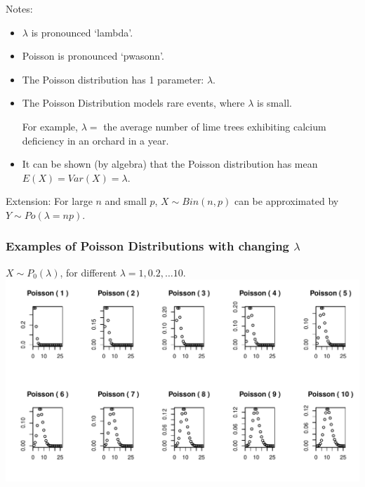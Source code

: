 \documentclass[t,xcolor=pdftex,dvipsnames,table]{beamer}\usepackage[]{graphicx}\usepackage[]{color}
\makeatletter
\def\maxwidth{ %
  \ifdim\Gin@nat@width>\linewidth
    \linewidth
  \else
    \Gin@nat@width
  \fi
}
\newenvironment{knitrout}{}{} %
\makeatother
\begin{document}
\begin{frame}
Notes:
\begin{itemize}
\item $\lambda$ is pronounced `lambda'.
\item Poisson is pronounced `pwasonn'.
\item The Poisson distribution has 1 parameter: $\lambda$.
\item 
The Poisson Distribution models rare events, where $\lambda$ is small.

For example, $\lambda=$ the average number of lime trees exhibiting calcium deficiency in an orchard in a year.
\item It can be shown (by algebra) that the Poisson distribution has mean $E(X)=Var(X)=\lambda.$
\end{itemize}

\vspace{.5cm}
Extension: For large $n$ and small $p$, $X \sim Bin(n,p)$ can be approximated by $Y \sim Po(\lambda=np)$.
\end{frame}

\begin{frame}[fragile]\frametitle{Examples of Poisson Distributions with changing $\lambda$}

$X \sim P_{0}(\lambda)$, for different $\lambda=1,0.2,\ldots 10$. \\

\vspace{0.5cm}
\begin{knitrout}
\color{fgcolor}
\includegraphics[width=\maxwidth]{figure/unnamed-chunk-72-1} 

\end{knitrout}
\end{frame}
\end{document}
